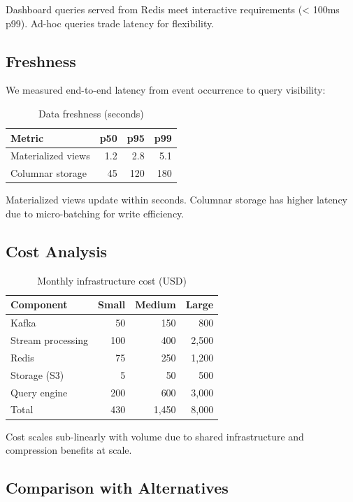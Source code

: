 \documentclass[11pt,twocolumn]{article}
\begin{document}
Dashboard queries served from Redis meet interactive requirements (< 100ms p99). Ad-hoc queries trade latency for flexibility.

\subsection{Freshness}

We measured end-to-end latency from event occurrence to query visibility:

\begin{table}[h]
\centering
\caption{Data freshness (seconds)}
\label{tab:freshness}
\begin{tabular}{lrrr}
\hline
Metric & p50 & p95 & p99 \\
\hline
Materialized views & 1.2 & 2.8 & 5.1 \\
Columnar storage & 45 & 120 & 180 \\
\hline
\end{tabular}
\end{table}

Materialized views update within seconds. Columnar storage has higher latency due to micro-batching for write efficiency.

\subsection{Cost Analysis}

\begin{table}[h]
\centering
\caption{Monthly infrastructure cost (USD)}
\label{tab:cost}
\begin{tabular}{lrrr}
\hline
Component & Small & Medium & Large \\
\hline
Kafka & 50 & 150 & 800 \\
Stream processing & 100 & 400 & 2,500 \\
Redis & 75 & 250 & 1,200 \\
Storage (S3) & 5 & 50 & 500 \\
Query engine & 200 & 600 & 3,000 \\
\hline
Total & 430 & 1,450 & 8,000 \\
\hline
\end{tabular}
\end{table}

Cost scales sub-linearly with volume due to shared infrastructure and compression benefits at scale.

\subsection{Comparison with Alternatives}
\end{document}
